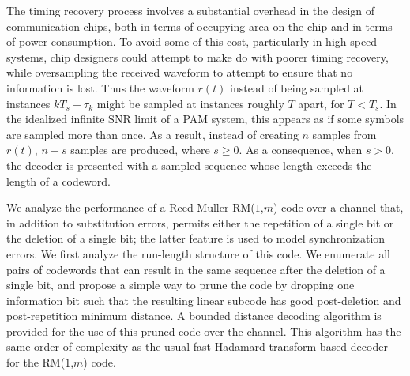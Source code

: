 The timing recovery process involves a substantial overhead in the
design of communication chips, both in terms of occupying area on
the chip and in terms of power consumption. To avoid some of this
cost, particularly in high speed systems, chip designers could
attempt to make do with poorer timing recovery, while oversampling
the received waveform to attempt to ensure that no information is
lost. Thus the waveform $r(t)$ instead of being sampled at
instances $kT_s+\tau_k$ might be sampled at instances roughly $T$
apart, for $T<T_s$. In the idealized infinite SNR limit of a PAM
system, this appears as if some symbols are sampled more than
once. As a result, instead of creating $n$ samples from $r(t)$,
$n+s$ samples are produced, where $s \geq 0$. As a consequence,
when $s>0$, the decoder is presented with a sampled sequence whose
length exceeds the length of a codeword.

We analyze the performance of a Reed-Muller RM($1$,$m$) code over
a channel that, in addition to substitution errors, permits either
the repetition of a single bit or the deletion of a single bit;
the latter feature is used to model synchronization errors. We
first analyze the run-length structure of this code. We enumerate
all pairs of codewords that can result in the same sequence after
the deletion of a single bit, and propose a simple way to prune
the code by dropping one information bit such that the resulting
linear subcode has good post-deletion and post-repetition minimum
distance. A bounded distance decoding algorithm is provided for
the use of this pruned code over the channel. This algorithm has
the same order of complexity as the usual fast Hadamard transform
based decoder for the RM($1$,$m$) code.
